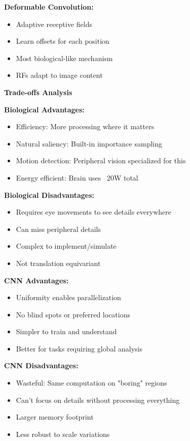 \documentclass[12pt]{article}
\newcommand{\explanation}[1]{{\color{explanationcolor}#1}}
\begin{document}
\begin{enumerate}[(a)]
{{    \textbf{Deformable Convolution:}
    \begin{itemize}
        \item Adaptive receptive fields
        \item Learn offsets for each position
        \item Most biological-like mechanism
        \item RFs adapt to image content
    \end{itemize}
    }
    
    \textbf{Trade-offs Analysis}
    
    \explanation{
    \textbf{Biological Advantages:}
    \begin{itemize}
        \item Efficiency: More processing where it matters
        \item Natural saliency: Built-in importance sampling
        \item Motion detection: Peripheral vision specialized for this
        \item Energy efficient: Brain uses ~20W total
    \end{itemize}
    
    \textbf{Biological Disadvantages:}
    \begin{itemize}
        \item Requires eye movements to see details everywhere
        \item Can miss peripheral details
        \item Complex to implement/simulate
        \item Not translation equivariant
    \end{itemize}
    
    \textbf{CNN Advantages:}
    \begin{itemize}
        \item Uniformity enables parallelization
        \item No blind spots or preferred locations
        \item Simpler to train and understand
        \item Better for tasks requiring global analysis
    \end{itemize}
    
    \textbf{CNN Disadvantages:}
    \begin{itemize}
        \item Wasteful: Same computation on "boring" regions
        \item Can't focus on details without processing everything
        \item Larger memory footprint
        \item Less robust to scale variations
    \end{itemize}
    
}}
\end{enumerate}
\end{document}
